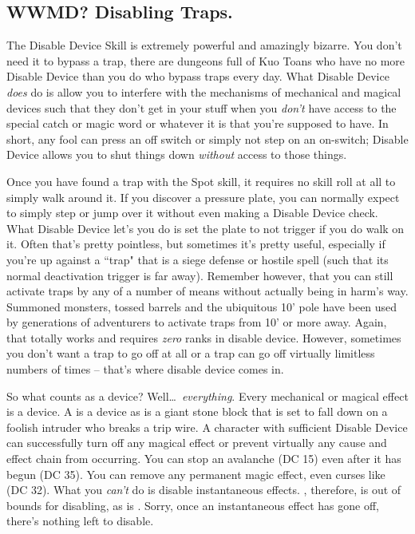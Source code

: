 \subsection{WWMD? Disabling Traps.}
\vspace*{-8pt}

The Disable Device Skill is extremely powerful and amazingly bizarre. You don't need it to bypass a trap, there are dungeons full of Kuo Toans who have no more Disable Device than you do who bypass traps every day. What Disable Device \textit{does} do is allow you to interfere with the mechanisms of mechanical and magical devices such that they don't get in your stuff when you \textit{don't} have access to the special catch or magic word or whatever it is that you're supposed to have. In short, any fool can press an off switch or simply not step on an on-switch; Disable Device allows you to shut things down \textit{without} access to those things.

Once you have found a trap with the Spot skill, it requires no skill roll at all to simply walk around it. If you discover a pressure plate, you can normally expect to simply step or jump over it without even making a Disable Device check. What Disable Device let's you do is set the plate to not trigger if you do walk on it. Often that's pretty pointless, but sometimes it's pretty useful, especially if you're up against a ``trap" that is a siege defense or hostile spell (such that its normal deactivation trigger is far away). Remember however, that you can still activate traps by any of a number of means without actually being in harm's way. Summoned monsters, tossed barrels and the ubiquitous 10' pole have been used by generations of adventurers to activate traps from 10' or more away. Again, that totally works and requires \textit{zero} ranks in disable device. However, sometimes you don't want a trap to go off at all or a trap can go off virtually limitless numbers of times -- that's where disable device comes in.

So what counts as a device? Well\ldots\ \textit{everything}. Every mechanical or magical effect is a device. A  is a device as is a giant stone block that is set to fall down on a foolish intruder who breaks a trip wire. A character with sufficient Disable Device can successfully turn off any magical effect or prevent virtually any cause and effect chain from occurring. You can stop an avalanche (DC 15) even after it has begun (DC 35). You can remove any permanent magic effect, even curses like  (DC 32). What you \textit{can't} do is disable instantaneous effects. , therefore, is out of bounds for disabling, as is . Sorry, once an instantaneous effect has gone off, there's nothing left to disable.

